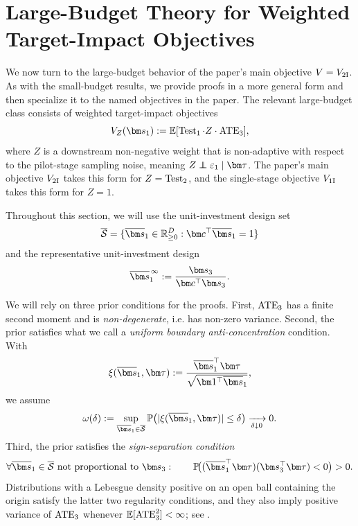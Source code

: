 \section{Large-Budget Theory for Weighted Target-Impact Objectives}
\label{sec:large-budget-general-prior-appendix}

We now turn to the large-budget behavior of the paper's main objective $V=V_{\mathrm{2I}}$.
As with the small-budget results, we provide proofs in a more general form and then specialize it to the named objectives in the paper.
The relevant large-budget class consists of weighted target-impact objectives
\[
  V_Z(\bm s_1)
  \defeq
  \E[\Test_1\cdot Z\cdot \ATE_3],
\]
where $Z$ is a downstream non-negative weight that is non-adaptive with respect to the pilot-stage sampling noise, meaning $Z\ind \varepsilon_1\mid\bm\tau$.
The paper's main objective $V_{\mathrm{2I}}$ takes this form for $Z=\operatorname{Test}_2$, and the single-stage objective $V_{\mathrm{1I}}$ takes this form for $Z=1$.

Throughout this section, we will use the unit-investment design set
\[
  \overline{\mathcal S}
  =
  \{\overline{\bm s}_1\in\R_{\ge0}^D:\bm c^\top\overline{\bm s}_1=1\}
\]
and the representative unit-investment design
\[
  \overline{\bm s}_1^{\,\infty}
  \defeq
  \frac{\bm s_3}{\bm c^\top\bm s_3}.
\]

We will rely on three prior conditions for the proofs.
First, $\mathrm{ATE}_3$ has a finite second moment and is \emph{non-degenerate}, i.e. has non-zero variance.
Second, the prior satisfies what we call a \emph{uniform boundary anti-concentration} condition.
With
\[
  \xi(\overline{\bm s}_1,\bm\tau)
  \defeq
  \frac{\overline{\bm s}_1^\top\bm\tau}
  {\sqrt{\bm1^\top\overline{\bm s}_1}},
\]
we assume
\begin{equation}
  \omega(\delta)
  \defeq
  \sup_{\overline{\bm s}_1\in\overline{\mathcal S}}
  \P\!\left(|\xi(\overline{\bm s}_1,\bm\tau)|\le \delta\right)
  \xrightarrow[\delta\downarrow0]{}0.
  \label{eq:uniform-boundary-anti-concentration-large-budget-appendix}
\end{equation}
Third, the prior satisfies the \emph{sign-separation condition}
\begin{equation}
  \forall \overline{\bm s}_1\in\overline{\mathcal{S}}\text{ not proportional to }\bm s_3:\qquad
  \P\!\big((\overline{\bm s}_1^\top\bm\tau)(\bm s_3^\top\bm\tau)<0\big)>0.
  \label{eq:ordinary-sign-separation-large-budget-appendix}
\end{equation}
Distributions with a Lebesgue density positive on an open ball containing the origin satisfy the latter two regularity conditions, and they also imply positive variance of $\mathrm{ATE}_3$ whenever $\mathbb{E}[\mathrm{ATE}_3^2]<\infty$; see .

